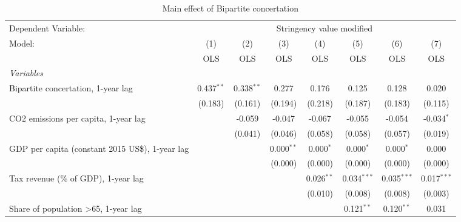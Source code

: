 
\begin{table}[htbp]
   \caption{Main effect of Bipartite concertation}
   \centering
   \begin{tabular}{lccccccc}
      \toprule
      Dependent Variable: & \multicolumn{7}{c}{Stringency value modified}\\
      Model:                                                & (1)          & (2)          & (3)          & (4)          & (5)           & (6)           & (7)\\  
                                                            &  OLS         & OLS          & OLS          & OLS          & OLS           & OLS           & OLS\\  
      \midrule
      \emph{Variables}\\
      Bipartite concertation, 1-year lag                    & 0.437$^{**}$ & 0.338$^{**}$ & 0.277        & 0.176        & 0.125         & 0.128         & 0.020\\   
                                                            & (0.183)      & (0.161)      & (0.194)      & (0.218)      & (0.187)       & (0.183)       & (0.115)\\   
      CO2 emissions per capita, 1-year lag                  &              & -0.059       & -0.047       & -0.067       & -0.055        & -0.054        & -0.034$^{*}$\\   
                                                            &              & (0.041)      & (0.046)      & (0.058)      & (0.058)       & (0.057)       & (0.019)\\   
      GDP per capita (constant 2015 US\$), 1-year lag       &              &              & 0.000$^{**}$ & 0.000$^{*}$  & 0.000$^{*}$   & 0.000$^{*}$   & 0.000\\   
                                                            &              &              & (0.000)      & (0.000)      & (0.000)       & (0.000)       & (0.000)\\   
      Tax revenue (\% of GDP), 1-year lag                   &              &              &              & 0.026$^{**}$ & 0.034$^{***}$ & 0.035$^{***}$ & 0.017$^{***}$\\   
                                                            &              &              &              & (0.010)      & (0.008)       & (0.008)       & (0.003)\\   
      Share of population >65, 1-year lag                   &              &              &              &              & 0.121$^{**}$  & 0.120$^{**}$  & 0.031\\   

\end{tabular}
\end{table}
